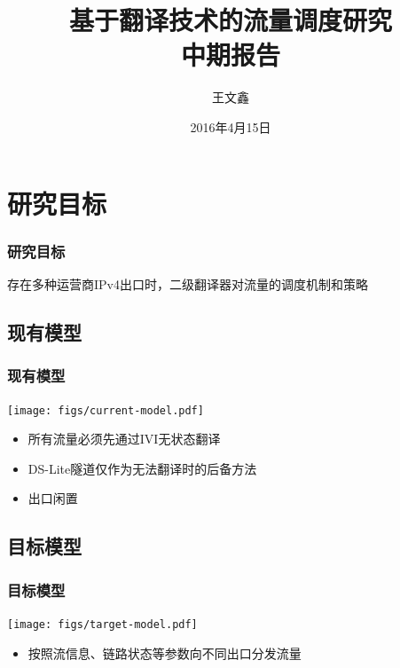 \documentclass{beamer}
\title{
  基于翻译技术的流量调度研究 \\
  中期报告
}
\author{王文鑫}
\date{2016年4月15日}
\begin{document}
\begin{frame}
  \titlepage
\end{frame}

\section{研究目标}

\begin{frame}
  \frametitle{研究目标}

  存在多种运营商IPv4出口时，二级翻译器对流量的调度机制和策略
\end{frame}

\subsection{现有模型}
\begin{frame}
  \frametitle{现有模型}

  \begin{center}
    \texttt{[image: figs/current-model.pdf]}  
  \end{center}

  \vspace{1em}

  \begin{block}{}
    \begin{itemize}
    \item 所有流量必须先通过IVI无状态翻译
    \item DS-Lite隧道仅作为无法翻译时的后备方法
    \item 出口闲置
    \end{itemize}
  \end{block}
\end{frame}

\subsection{目标模型}
\begin{frame}
  \frametitle{目标模型}

  \begin{center}
    \texttt{[image: figs/target-model.pdf]}  
  \end{center}

  \begin{block}{}
    \begin{itemize}
    \item 按照流信息、链路状态等参数向不同出口分发流量
    \end{itemize}
  \end{block}
\end{frame}
\end{document}

